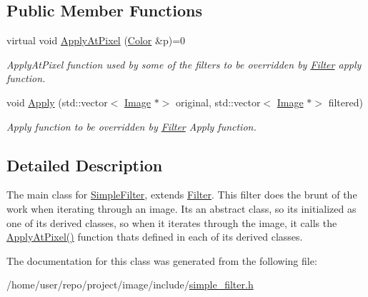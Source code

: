 \subsection*{Public Member Functions}
\begin{DoxyCompactItemize}
\item 
\mbox{\label{classSimpleFilter_ad47d7f994aa0f80f9013d689b82a0b92}} 
virtual void \hyperlink{classSimpleFilter_ad47d7f994aa0f80f9013d689b82a0b92}{Apply\+At\+Pixel} (\hyperlink{classColor}{Color} \&p)=0
\begin{DoxyCompactList}\small\item\em Apply\+At\+Pixel function used by some of the filters to be overridden by \hyperlink{classFilter}{Filter} apply function. \end{DoxyCompactList}\item 
\mbox{\label{classSimpleFilter_a4400a0f97e26e84a33befd537fb4fea8}} 
void \hyperlink{classSimpleFilter_a4400a0f97e26e84a33befd537fb4fea8}{Apply} (std\+::vector$<$ \hyperlink{classImage}{Image} $\ast$$>$ original, std\+::vector$<$ \hyperlink{classImage}{Image} $\ast$$>$ filtered)
\begin{DoxyCompactList}\small\item\em Apply function to be overridden by \hyperlink{classFilter}{Filter} Apply function. \end{DoxyCompactList}\end{DoxyCompactItemize}


\subsection{Detailed Description}
The main class for \hyperlink{classSimpleFilter}{Simple\+Filter}, extends \hyperlink{classFilter}{Filter}. This filter does the brunt of the work when iterating through an image. It\textquotesingle{}s an abstract class, so it\textquotesingle{}s initialized as one of it\textquotesingle{}s derived classes, so when it iterates through the image, it calls the \hyperlink{classSimpleFilter_ad47d7f994aa0f80f9013d689b82a0b92}{Apply\+At\+Pixel()} function that\textquotesingle{}s defined in each of it\textquotesingle{}s derived classes. 

The documentation for this class was generated from the following file\+:\begin{DoxyCompactItemize}
\item 
/home/user/repo/project/image/include/\hyperlink{simple__filter_8h}{simple\+\_\+filter.\+h}\end{DoxyCompactItemize}
